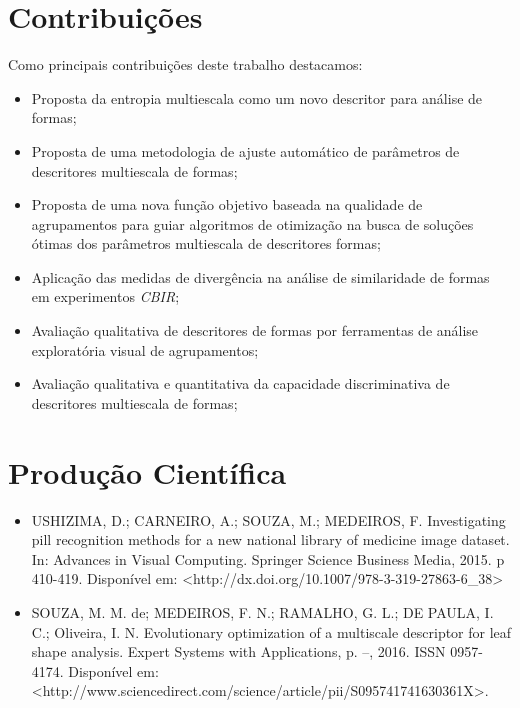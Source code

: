 \section{Contribuições \label{sec:contrib}}

Como principais contribuições deste trabalho destacamos:

\begin{itemize}
\item Proposta da entropia multiescala como um novo descritor para análise de formas;

\item Proposta de uma metodologia de ajuste automático de parâmetros de descritores multiescala de formas;

\item Proposta de uma nova função objetivo baseada na qualidade de agrupamentos para guiar  algoritmos de otimização na busca de soluções ótimas dos parâmetros multiescala de descritores formas; 

\item Aplicação das medidas de divergência na análise de similaridade de formas em experimentos \emph{CBIR};

\item Avaliação qualitativa de descritores de formas por ferramentas de análise exploratória visual de agrupamentos;

\item Avaliação qualitativa e quantitativa da capacidade discriminativa de descritores multiescala de formas;

\end{itemize}



\section {Produção Científica \label{sec:prod_cientif}}
\begin{itemize}

\item USHIZIMA, D.; CARNEIRO, A.; SOUZA, M.; MEDEIROS, F. Investigating pill recognition methods for a new national library of
medicine image dataset. In: Advances in Visual Computing. Springer Science Business Media, 2015. p 410-419. Disponível em: <http://dx.doi.org/10.1007/978-3-319-27863-6\_38>

\item SOUZA, M. M. de; MEDEIROS, F. N.; RAMALHO, G. L.; DE PAULA, I. C.; Oliveira, I. N. Evolutionary optimization of a multiscale descriptor for leaf
shape analysis. Expert Systems with Applications, p. –, 2016. ISSN 0957-4174. Disponível
em: <http://www.sciencedirect.com/science/article/pii/S095741741630361X>.

\end{itemize}
